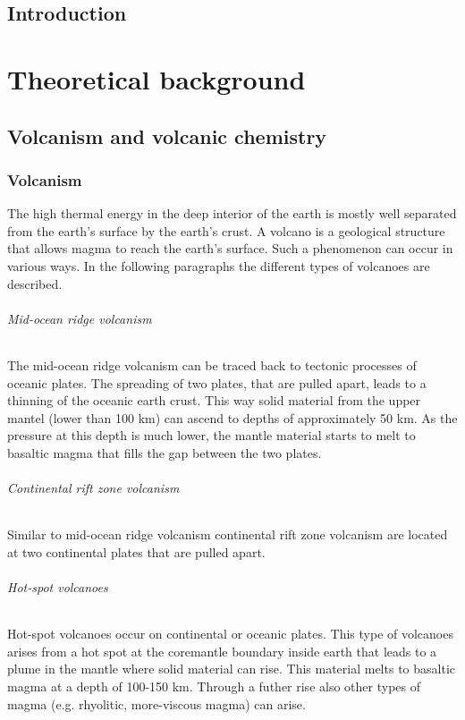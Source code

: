 \documentclass  [
  paper    = a4,
  BCOR     = 10mm,
  twoside,
  fontsize = 12pt,
  fleqn,
  toc      = bibnumbered,
  toc      = listofnumbered,
  numbers  = noendperiod,
  headings = normal,
  listof   = leveldown,
  version  = 3.03
]                                       {scrreprt}
\begin{document}
  

  \tableofcontents
	\chapter{Introduction}	
	
    \part{Theoretical background}
\chapter{Volcanism and volcanic chemistry}
\section{Volcanism}
The high thermal energy in the deep interior of the earth is mostly well separated from the earth’s surface by the earth’s crust. A volcano is a geological structure that allows magma to reach the earth’s surface. Such a phenomenon can occur in various ways. In the following paragraphs the different types of volcanoes are described.
\paragraph{ Mid-ocean ridge volcanism}
The mid-ocean ridge volcanism can be traced back to tectonic processes of oceanic plates. The spreading of two plates, that are pulled apart, leads to a thinning of the oceanic earth crust. This way solid material from the upper mantel (lower than 100 km) can ascend to depths of approximately 50 km. As the pressure at this depth is much lower, the mantle material starts to melt to basaltic magma that fills the gap between the two plates.
\paragraph{ Continental rift zone volcanism}
Similar to mid-ocean ridge volcanism continental rift zone volcanism are located at two continental plates that are pulled apart.
\paragraph{ Hot-spot volcanoes} Hot-spot volcanoes occur on continental or oceanic plates. This type of volcanoes arises from a hot spot at the coremantle boundary inside earth that leads to a plume in the mantle where solid material can rise. This material melts to basaltic magma at a depth of 100-150 km. Through a futher rise also other types of magma (e.g. rhyolitic, more-viscous magma) can arise.
\end{document}
